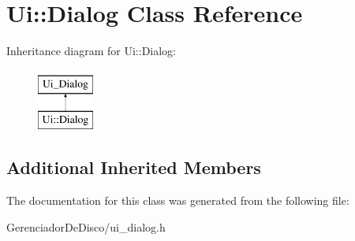 \hypertarget{classUi_1_1Dialog}{\section{Ui\+:\+:Dialog Class Reference}
\label{classUi_1_1Dialog}
}
Inheritance diagram for Ui\+:\+:Dialog\+:\begin{figure}[H]
\begin{center}
\leavevmode
\includegraphics[height=2.000000cm]{classUi_1_1Dialog}
\end{center}
\end{figure}
\subsection*{Additional Inherited Members}


The documentation for this class was generated from the following file\+:\begin{DoxyCompactItemize}
\item 
Gerenciador\+De\+Disco/ui\+\_\+dialog.\+h\end{DoxyCompactItemize}
